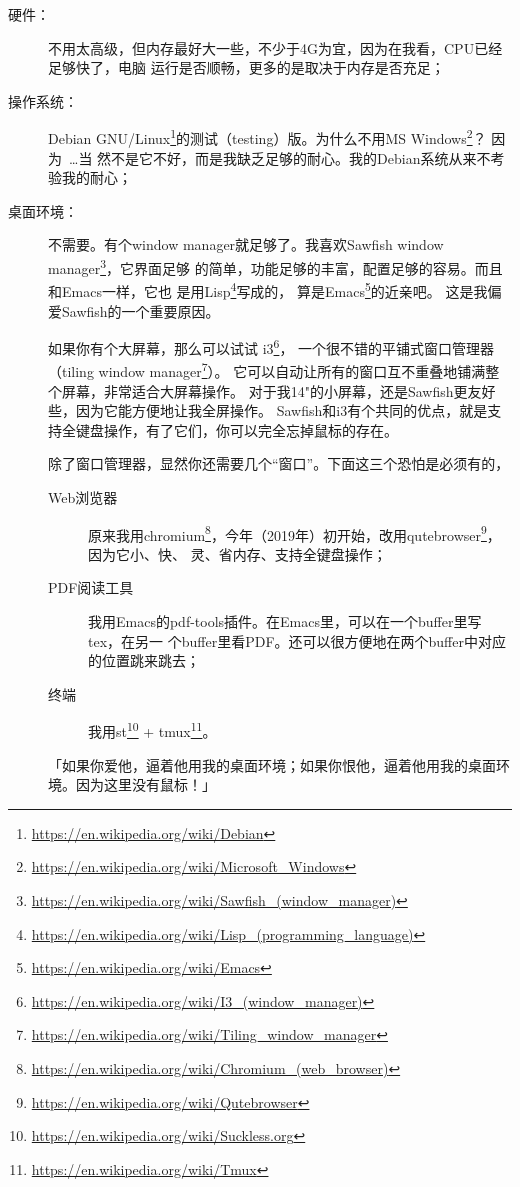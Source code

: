 \begin{description}
\item[硬件：]不用太高级，但内存最好大一些，不少于4G为宜，因为在我看，CPU已经足够快了，电脑
  运行是否顺畅，更多的是取决于内存是否充足；
\item[操作系统：]Debian
  GNU/Linux\footnote{\url{https://en.wikipedia.org/wiki/Debian}}的测试（testing）版。为什么不用MS
  Windows\footnote{\url{https://en.wikipedia.org/wiki/Microsoft_Windows}}？ 因为~\ldots 当
  然不是它不好，而是我缺乏足够的耐心。我的Debian系统从来不考验我的耐心；
\item[桌面环境：]不需要。有个window manager就足够了。我喜欢Sawfish window
  manager\footnote{\url{https://en.wikipedia.org/wiki/Sawfish_(window_manager)}}，它界面足够
  的简单，功能足够的丰富，配置足够的容易。而且和Emacs一样，它也
  是用Lisp\footnote{\url{https://en.wikipedia.org/wiki/Lisp_(programming_language)}}写成的，
  算是Emacs\footnote{\url{https://en.wikipedia.org/wiki/Emacs}}的近亲吧。
  这是我偏爱Sawfish的一个重要原因。

  如果你有个大屏幕，那么可以试试%
  i3\footnote{\url{https://en.wikipedia.org/wiki/I3_(window_manager)}}，%
  一个很不错的平铺式窗口管理器（tiling window %
  manager\footnote{\url{https://en.wikipedia.org/wiki/Tiling_window_manager}}）。%
  它可以自动让所有的窗口互不重叠地铺满整个屏幕，非常适合大屏幕操作。%
  对于我14"的小屏幕，还是Sawfish更友好些，因为它能方便地让我全屏操作。
  Sawfish和i3有个共同的优点，就是支持全键盘操作，有了它们，你可以完全忘掉鼠标的存在。
  
  除了窗口管理器，显然你还需要几个“窗口”。下面这三个恐怕是必须有的，

  \begin{description}
  \item[Web浏览器] 原来我用chromium\footnote{\url{https://en.wikipedia.org/wiki/Chromium_(web_browser)}}，今年（2019年）初开始，改用qutebrowser\footnote{\url{https://en.wikipedia.org/wiki/Qutebrowser}}，因为它小、快、
    灵、省内存、支持全键盘操作；
  \item[PDF阅读工具] 我用Emacs的pdf-tools插件。在Emacs里，可以在一个buffer里写tex，在另一
    个buffer里看PDF。还可以很方便地在两个buffer中对应的位置跳来跳去；
  \item[终端] 我用st\footnote{\url{https://en.wikipedia.org/wiki/Suckless.org}} + %
    tmux\footnote{\url{https://en.wikipedia.org/wiki/Tmux}}。
  \end{description}

  「如果你爱他，逼着他用我的桌面环境；如果你恨他，逼着他用我的桌面环境。因为这里没有鼠标！」
  

\end{description}
